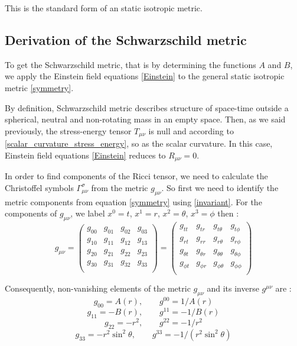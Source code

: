 This is the standard form of an static isotropic metric.

\subsection{Derivation of the Schwarzschild metric}

To get the Schwarzschild metric, that is by determining the functions $A$ and $B$, we apply the Einstein field equations \eqref{Einstein} to the general
static isotropic metric \eqref{symmetry}.

By definition, Schwarzschild metric describes structure of space-time outside a spherical, neutral and non-rotating mass in an empty space. Then, as we said previously, the
stress-energy tensor $T_{\mu\nu}$ is null and according to \eqref{scalar_curvature_stress_energy}, so as the scalar curvature. In this case, Einstein
field equations \eqref{Einstein} reduces to $R_{\mu\nu}=0$.

In order to find components of the Ricci tensor, we need to calculate the Christoffel symbols
$\Gamma^{\sigma}_{\mu\nu}$ from the metric $g_{\mu\nu}$. So first we need to identify the
metric components from equation \eqref{symmetry} using \eqref{invariant}. For the components
of $g_{\mu\nu}$, we label $x^0=t$, $x^1=r$, $x^2=\theta$, $x^3=\phi$ then :
%
\begin{equation}
g_{\mu\nu}=\left(
	\begin{array}{cccc}
	g_{00} & g_{01} & g_{02} & g_{03}\\
	g_{10} & g_{11} & g_{12} & g_{13}\\
	g_{20} & g_{21} & g_{22} & g_{23}\\
	g_{30} & g_{31} & g_{32} & g_{33}\\
	\end{array}
\right)=\left(
	\begin{array}{cccc}
	g_{tt} & g_{tr} & g_{t\theta} & g_{t\phi}\\
	g_{rt} & g_{rr} & g_{r\theta} & g_{r\phi}\\
	g_{\theta t} & g_{\theta r} & g_{\theta\theta} & g_{\theta\phi}\\
	g_{\phi t} & g_{\phi r} & g_{\phi\theta} & g_{\phi\phi}\\
		\end{array}
\right)
\end{equation}

Consequently, non-vanishing elements of the metric
$g_{\mu\nu}$ and its inverse $g^{\mu\nu}$ are :
%
\begin{equation}
	g_{00}=A\left(r\right),	\qquad g^{00}=1/A\left(r\right)
\end{equation}
%
\begin{equation}
	g_{11}=-B\left(r\right),\qquad g^{11}=-1/B\left(r\right)
\end{equation}
%
\begin{equation}
	g_{22}=-r^2,\qquad g^{22}=-1/r^2
\end{equation}
%
\begin{equation}
	g_{33}=-r^2\sin^2\theta,\qquad g^{33}=-1/\left(r^2\sin^2\theta\right)
\end{equation}

